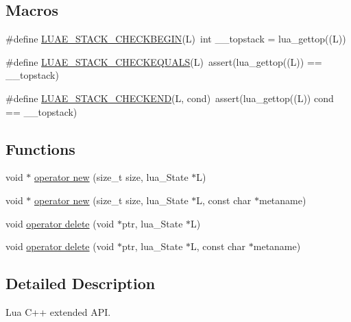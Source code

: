 \subsection*{Macros}
\begin{DoxyCompactItemize}
\item 
\#define \hyperlink{a00089_a796ba54c8d36c5d2ed9b54011e04e1b9}{L\-U\-A\-E\-\_\-\-S\-T\-A\-C\-K\-\_\-\-C\-H\-E\-C\-K\-B\-E\-G\-I\-N}(L)~int \-\_\-\-\_\-topstack = lua\-\_\-gettop((L))
\item 
\#define \hyperlink{a00089_affc41007cf13d87258012968a34f895f}{L\-U\-A\-E\-\_\-\-S\-T\-A\-C\-K\-\_\-\-C\-H\-E\-C\-K\-E\-Q\-U\-A\-L\-S}(L)~assert(lua\-\_\-gettop((L)) == \-\_\-\-\_\-topstack)
\item 
\#define \hyperlink{a00089_afba7ed6f302e884895a6e96ab51672d7}{L\-U\-A\-E\-\_\-\-S\-T\-A\-C\-K\-\_\-\-C\-H\-E\-C\-K\-E\-N\-D}(L, cond)~assert(lua\-\_\-gettop((L)) cond == \-\_\-\-\_\-topstack)
\end{DoxyCompactItemize}
\subsection*{Functions}
\begin{DoxyCompactItemize}
\item 
void $\ast$ \hyperlink{a00089_a5c81701d045f0eb587348084f7835dde}{operator new} (size\-\_\-t size, lua\-\_\-\-State $\ast$L)
\item 
void $\ast$ \hyperlink{a00089_a029e475dd3fce699e42804e5b2dac6b4}{operator new} (size\-\_\-t size, lua\-\_\-\-State $\ast$L, const char $\ast$metaname)
\item 
void \hyperlink{a00089_a0f52681693eff2700fac6f23061b1fce}{operator delete} (void $\ast$ptr, lua\-\_\-\-State $\ast$L)
\item 
void \hyperlink{a00089_a0df50030fd773d076e9e4579e14fe6a4}{operator delete} (void $\ast$ptr, lua\-\_\-\-State $\ast$L, const char $\ast$metaname)
\end{DoxyCompactItemize}


\subsection{Detailed Description}
Lua C++ extended A\-P\-I. 

